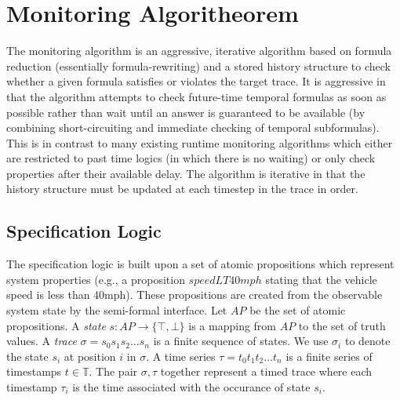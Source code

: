 
\section{Monitoring Algoritheorem}
The monitoring algorithm is an aggressive, iterative algorithm based on formula reduction (essentially formula-rewriting) and a stored history structure to check whether a given formula satisfies or violates the target trace. 
It is aggressive in that the algorithm attempts to check future-time temporal formulas as soon as possible rather than wait until an answer is guaranteed to be available (by combining short-circuiting and immediate checking of temporal subformulas).
This is in contrast to many existing runtime monitoring algorithms which either are restricted to past time logics (in which there is no waiting) or only check properties after their available delay. %
The algorithm is iterative in that the history structure must be updated at each timestep in the trace in order. 

\subsection{Specification Logic}
The specification logic is built upon a set of atomic propositions which represent system properties (e.g., a proposition $speedLT40mph$ stating that the vehicle speed is less than 40mph). These propositions are created from the observable system state by the semi-formal interface.
Let $AP$ be the set of atomic propositions. 
A \emph{state} $s: AP \rightarrow \{\top,\bot\}$ is a mapping from $AP$ to the set of truth values. A \emph{trace} $\sigma = s_0s_1s_2\ldots{}s_n$ is a finite sequence of states. We use $\sigma_i$ to denote the state $s_i$ at position $i$ in $\sigma$.
%
A time series $\tau = t_0t_1t_2\ldots{}t_n$ is a finite series of timestamps $t\in\mathbb{T}$. The pair $\sigma, \tau$ together represent a timed trace where each timestamp $\tau_i$ is the time associated with the occurance of state $s_i$.
%

